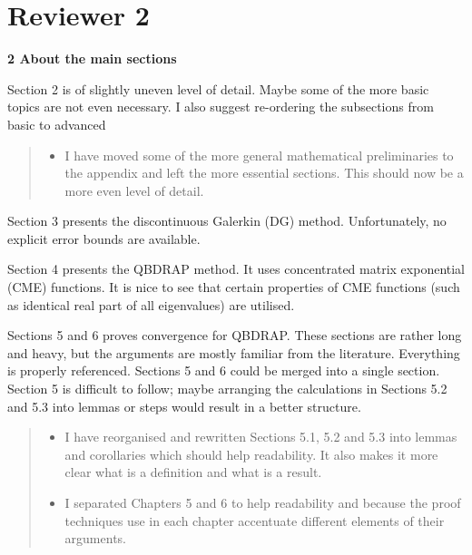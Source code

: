 \documentclass[a4paper]{article}
\begin{document}
\pagebreak
\section{Reviewer 2}

\noindent\textbf{2 About the main sections}


Section 2 is of slightly uneven level of detail. Maybe some of the more basic topics are not even necessary. I also suggest re-ordering the subsections from basic to advanced
\begin{quote}
    \begin{itemize}
        \item I have moved some of the more general mathematical preliminaries to the appendix and left the more essential sections. This should now be a more even level of detail.
    \end{itemize}
\end{quote}

Section 3 presents the discontinuous Galerkin (DG) method. Unfortunately, no explicit error bounds are available.

Section 4 presents the QBDRAP method. It uses concentrated matrix exponential (CME) functions. It is nice to see that certain properties of CME functions (such as identical real part of all eigenvalues) are utilised. 

Sections 5 and 6 proves convergence for QBDRAP. These sections are rather long and heavy, but the arguments are mostly familiar from the literature. Everything is properly referenced. Sections 5 and 6 could be merged into a single section. Section 5 is difficult to follow; maybe arranging the calculations in Sections 5.2 and 5.3 into lemmas or steps would result in a better structure.
\begin{quote}
    \begin{itemize}
        \item I have reorganised and rewritten Sections 5.1, 5.2 and 5.3 into lemmas and corollaries which should help readability. It also makes it more clear what is a definition and what is a result. 
        \item I separated Chapters 5 and 6 to help readability and because the proof techniques use in each chapter accentuate different elements of their arguments.
    \end{itemize}
\end{quote}
\end{document}

